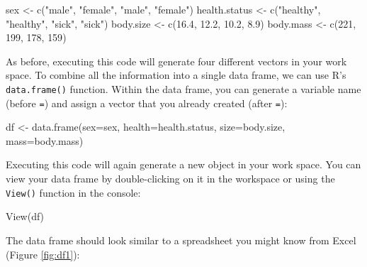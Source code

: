 \documentclass[
]{book}
\newenvironment{Shaded}{\begin{snugshade}}{\end{snugshade}}
\newcommand{\AttributeTok}[1]{\textcolor[rgb]{0.77,0.63,0.00}{#1}}
\newcommand{\DataTypeTok}[1]{\textcolor[rgb]{0.13,0.29,0.53}{#1}}
\newcommand{\DecValTok}[1]{\textcolor[rgb]{0.00,0.00,0.81}{#1}}
\newcommand{\FloatTok}[1]{\textcolor[rgb]{0.00,0.00,0.81}{#1}}
\newcommand{\FunctionTok}[1]{\textcolor[rgb]{0.00,0.00,0.00}{#1}}
\newcommand{\NormalTok}[1]{#1}
\newcommand{\OtherTok}[1]{\textcolor[rgb]{0.56,0.35,0.01}{#1}}
\newcommand{\StringTok}[1]{\textcolor[rgb]{0.31,0.60,0.02}{#1}}
\begin{document}
\begin{Shaded}
\begin{Highlighting}[]
\NormalTok{sex }\OtherTok{\textless{}{-}} \FunctionTok{c}\NormalTok{(}\StringTok{"male"}\NormalTok{, }\StringTok{"female"}\NormalTok{, }\StringTok{"male"}\NormalTok{, }\StringTok{"female"}\NormalTok{)}
\NormalTok{health.status }\OtherTok{\textless{}{-}} \FunctionTok{c}\NormalTok{(}\StringTok{"healthy"}\NormalTok{, }\StringTok{"healthy"}\NormalTok{, }\StringTok{"sick"}\NormalTok{, }\StringTok{"sick"}\NormalTok{)}
\NormalTok{body.size }\OtherTok{\textless{}{-}} \FunctionTok{c}\NormalTok{(}\FloatTok{16.4}\NormalTok{, }\FloatTok{12.2}\NormalTok{, }\FloatTok{10.2}\NormalTok{, }\FloatTok{8.9}\NormalTok{)}
\NormalTok{body.mass }\OtherTok{\textless{}{-}} \FunctionTok{c}\NormalTok{(}\DecValTok{221}\NormalTok{, }\DecValTok{199}\NormalTok{, }\DecValTok{178}\NormalTok{, }\DecValTok{159}\NormalTok{)}
\end{Highlighting}
\end{Shaded}

As before, executing this code will generate four different vectors in your work space. To combine all the information into a single data frame, we can use R's \texttt{data.frame()} function. Within the data frame, you can generate a variable name (before \texttt{=}) and assign a vector that you already created (after \texttt{=}):

\begin{Shaded}
\begin{Highlighting}[]
\NormalTok{df }\OtherTok{\textless{}{-}} \FunctionTok{data.frame}\NormalTok{(}\AttributeTok{sex=}\NormalTok{sex, }\AttributeTok{health=}\NormalTok{health.status, }\AttributeTok{size=}\NormalTok{body.size, }\AttributeTok{mass=}\NormalTok{body.mass)}
\end{Highlighting}
\end{Shaded}

Executing this code will again generate a new object in your work space. You can view your data frame by double-clicking on it in the workspace or using the \texttt{View()} function in the console:

\begin{Shaded}
\begin{Highlighting}[]
\DataTypeTok{View}\NormalTok{(df)}
\end{Highlighting}
\end{Shaded}

The data frame should look similar to a spreadsheet you might know from Excel (Figure \ref{fig:df1}):
\end{document}
